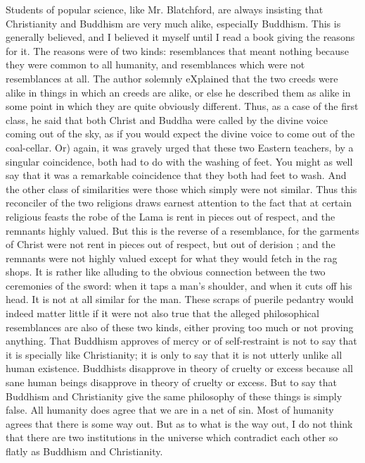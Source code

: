 \documentclass{book}
\begin{document}
Students of popular science, like Mr. Blatchford, are always insisting that Christianity and Buddhism are very much alike, especialIy Buddhism. This is generally believed, and I believed it myself until I read a book giving the reasons for it. The reasons were of two kinds: resemblances that meant nothing because they were common to all humanity, and resemblances which were not resemblances at all. The author solemnly eXplained that the two creeds were alike in things in which an creeds are alike, or else he described them as alike in some point in which they are quite obviously different. Thus, as a case of the first class, he said that both Christ and Buddha were called by the divine voice coming out of the sky, as if you would expect the divine voice to come out of the coal-cellar. Or) again, it was gravely urged that these two Eastern teachers, by a singular coincidence, both had to do with the washing of feet. You might as well say that it was a remarkable coincidence that they both had feet to wash. And the other class of similarities were those which simply were not similar. Thus this reconciler of the two religions draws earnest attention to the fact that at certain religious feasts the robe of the Lama is rent in pieces out of respect, and the remnants highly valued. But this is the reverse of a resemblance, for the garments of Christ were not rent in pieces out of respect, but out of derision ; and the remnants were not highly valued except for what they would fetch in the rag shops. It is rather like alluding to the obvious connection between the two ceremonies of the sword: when it taps a man’s shoulder, and when it cuts off his head. It is not at all similar for the man. These scraps of puerile pedantry would indeed matter little if it were not also true that the alleged philosophical resemblances are also of these two kinds, either proving too much or not proving anything. That Buddhism approves of mercy or of self-restraint is not to say that it is specially like Christianity; it is only to say that it is not utterly unlike all human existence. Buddhists disapprove in theory of cruelty or excess because all sane human beings disapprove in theory of cruelty or excess. But to say that Buddhism and Christianity give the same philosophy of these things is simply false. All humanity does agree that we are in a net of sin. Most of humanity agrees that there is some way out. But as to what is the way out, I do not think that there are two institutions in the universe which contradict each other so flatly as Buddhism and Christianity.
\end{document}
